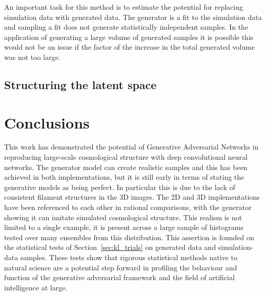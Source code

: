 \documentclass[twocolumn]{article}
\numberwithin{equation}{section}
\begin{document}
An important task for this method is to estimate the potential for replacing simulation data with generated data. The 
generator is a fit to the simulation data and sampling a fit does not generate statistically independent samples. In the 
application of generating a large volume of generated samples it is possible this would not be an issue if the factor of 
the increase in the total generated volume was not too large.


\subsection{Structuring the latent space}




\section{Conclusions}\label{sec:conclusions}
This work has demonstrated the potential of Generative Adversarial Networks in reproducing large-scale cosmological 
structure with deep convolutional neural networks. The generator model can create realistic samples and this has been 
achieved in both implementations, but it is still early in terms of stating the generative models as being perfect. In 
particular this is due to the lack of consistent filament structures in the 3D images. The 2D and 3D implementations have 
been referenced to each other in rational comparisons, with the generator showing it can imitate simulated cosmological 
structure. %
This realism is not limited to a single example, it is present across a large sample of histograms tested over many 
ensembles from this distribution. This assertion is founded on the statistical tests of Section~\ref{sec:kl_trials} on 
generated data and simulation-data samples. These tests show that rigorous statistical methods native to natural science 
are a potential step forward in profiling the behaviour and function of the generative adversarial framework and the field
of artificial intelligence at large. 
\end{document}
